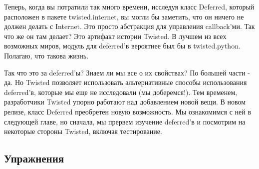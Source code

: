 Теперь, когда вы потратили так много времени, исследуя 
класс Deferred, который расположен в пакете twisted.internet, 
вы могли бы заметить, что он ничего не должен делать с Internet. 
Это просто абстракция для управления callback'ми. Так что же он там 
делает? Это артифакт истории Twisted. В лучшем из всех 
возможных миров, модуль для deferred'в вероятнее был бы в twisted.python. 
Полагаю, что такова жизнь.  


Так что это за deferred'ы? Знаем ли мы все о их свойствах? 
По большей части - да. Но Twisted позволяет использовать 
альтернативные способы использования deferred'в, которые 
мы еще не исследовали (мы доберемся!). Тем временем, 
разработчики Twisted упорно работают над добавлением новой 
вещи. В новом релизе, класс Deferred преобретен новую 
возможность. Мы ознакомимся с ней в следующей главе, но 
сначала, мы прервем изучение deferred'в и посмотрим 
на некоторые стороны Twisted, включая тестирование.


\subsection{Упражнения}


